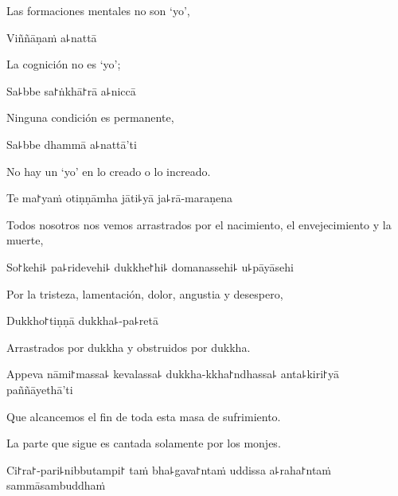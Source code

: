 \begin{english}
  Las formaciones mentales no son ‘yo’,
\end{english}

Viññāṇaṁ a꜕nattā

\begin{english}
  La cognición no es ‘yo’;
\end{english}

Sa꜕bbe sa꜓ṅkhā꜓rā a꜕niccā

\begin{english}
  Ninguna condición es permanente,
\end{english}

Sa꜕bbe dhammā a꜕nattā'ti

\begin{english}
  No hay un ‘yo’ en lo creado o lo increado.
\end{english}

\clearpage

Te ma꜓yaṁ otiṇṇāmha jāti꜕yā ja꜕rā-maraṇena

\begin{english}
  Todos nosotros nos vemos arrastrados por el nacimiento, el envejecimiento y la muerte,
\end{english}

So꜓kehi꜕ pa꜕ridevehi꜕ dukkhe꜓hi꜕ domanassehi꜕ u꜕pāyāsehi

\begin{english}
  Por la tristeza, lamentación, dolor, angustia y desespero,
\end{english}

Dukkho꜓tiṇṇā dukkha꜕-pa꜕retā

\begin{english}
  Arrastrados por dukkha y obstruidos por dukkha.
\end{english}

Appeva nāmi꜓massa꜕ kevalassa꜕ dukkha-kkha꜓ndhassa꜕ anta꜕kiri꜓yā \\paññāyethā'ti

\begin{english}
  Que alcancemos el fin de toda esta masa de sufrimiento.
\end{english}

\begin{instruction}
  La parte que sigue es cantada solamente por los monjes.
\end{instruction}

Ci꜓ra꜓-pari꜕nibbutampi꜓ taṁ bha꜕gava꜓ntaṁ uddissa a꜕raha꜓ntaṁ sammāsambuddhaṁ

